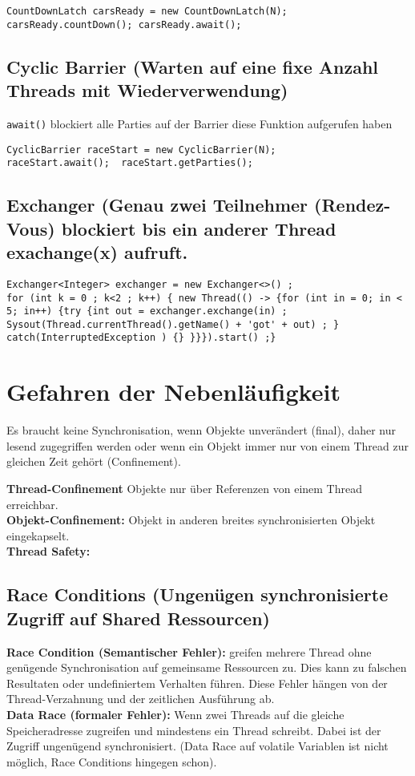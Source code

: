 \begin{lstlisting}[style=java]
CountDownLatch carsReady = new CountDownLatch(N);
carsReady.countDown(); carsReady.await();
\end{lstlisting}

\subsection{Cyclic Barrier (Warten auf eine fixe Anzahl Threads mit Wiederverwendung)}
\lstinline|await()| blockiert alle Parties auf der Barrier diese Funktion aufgerufen haben 

\begin{lstlisting}[style=java]
CyclicBarrier raceStart = new CyclicBarrier(N); 
raceStart.await();  raceStart.getParties(); 
\end{lstlisting}

\subsection{Exchanger (Genau zwei Teilnehmer (Rendez-Vous) blockiert bis ein anderer Thread exachange(x) aufruft.}
\begin{lstlisting}[style=java]
Exchanger<Integer> exchanger = new Exchanger<>() ; 
for (int k = 0 ; k<2 ; k++) { new Thread(() -> {for (int in = 0; in < 5; in++) {try {int out = exchanger.exchange(in) ; Sysout(Thread.currentThread().getName() + 'got' + out) ; } catch(InterruptedException ) {} }}}).start() ;}
\end{lstlisting}


\section{Gefahren der Nebenläufigkeit}
Es braucht keine Synchronisation, wenn Objekte unverändert (final), daher nur lesend zugegriffen werden oder wenn ein Objekt immer nur von einem Thread zur gleichen Zeit gehört (Confinement). 

\textbf{Thread-Confinement} Objekte nur über Referenzen von einem Thread erreichbar. \\
\textbf{Objekt-Confinement:} Objekt in anderen breites synchronisierten Objekt eingekapselt. \\
\textbf{Thread Safety:} 

\subsection{Race Conditions (Ungenügen synchronisierte Zugriff auf Shared Ressourcen)}
\textbf{Race Condition (Semantischer Fehler):} greifen mehrere Thread ohne genügende Synchronisation auf gemeinsame Ressourcen zu. Dies kann zu falschen Resultaten oder undefiniertem Verhalten führen. Diese Fehler hängen von der Thread-Verzahnung und der zeitlichen Ausführung ab.  \\
\textbf{Data Race (formaler Fehler):} Wenn zwei Threads auf die gleiche Speicheradresse zugreifen und mindestens ein Thread schreibt. Dabei ist der Zugriff ungenügend synchronisiert. (Data Race auf volatile Variablen ist nicht möglich, Race Conditions hingegen schon). 

